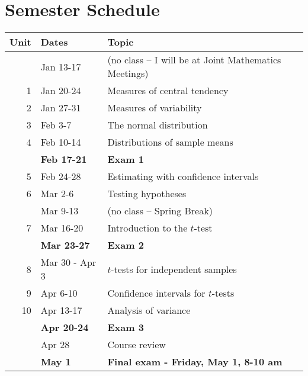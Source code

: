 \documentclass[10pt]{article}
\begin{document}
\section*{Semester Schedule}
\label{sec:orgdaedd78}
\begin{center}
\begin{tabular}{rll}
Unit & Dates & Topic\\
\hline
 & Jan 13-17 & (no class -- I will be at Joint Mathematics Meetings)\\
1 & Jan 20-24 & Measures of central tendency\\
2 & Jan 27-31 & Measures of variability\\
3 & Feb 3-7 & The normal distribution\\
4 & Feb 10-14 & Distributions of sample means\\
 & \textbf{Feb 17-21} & \textbf{Exam 1}\\
5 & Feb 24-28 & Estimating with confidence intervals\\
6 & Mar 2-6 & Testing hypotheses\\
 & Mar 9-13 & (no class -- Spring Break)\\
7 & Mar 16-20 & Introduction to the \(t\)-test\\
 & \textbf{Mar 23-27} & \textbf{Exam 2}\\
8 & Mar 30 - Apr 3 & \(t\)-tests for independent samples\\
9 & Apr 6-10 & Confidence intervals for \(t\)-tests\\
10 & Apr 13-17 & Analysis of variance\\
 & \textbf{Apr 20-24} & \textbf{Exam 3}\\
 & Apr 28 & Course review\\
 & \textbf{May 1} & \textbf{Final exam - Friday, May 1, 8-10 am}\\
\end{tabular}
\end{center}
\end{document}
